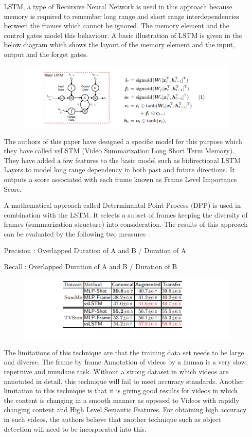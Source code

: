 \documentclass[twocolumn,showpacs,%
  nofootinbib,aps,superscriptaddress,%
  eqsecnum,prd,notitlepage,showkeys,10pt]{revtex4-1}
\begin{document}
LSTM, a type of Recursive Neural Network is used in this approach because memory is required to remember long range and short range interdependencies between the frames which cannot be ignored. The memory element and the control gates model this behaviour. A basic illustration of LSTM is given in the below diagram which shows the layout of the memory element and the input, output and the forget gates.
\begin{figure}[h]
\includegraphics[width=\linewidth]{img1.PNG}
\end{figure}

The authors of this paper have designed a specific model for this purpose which they have called vsLSTM (Video Summarization Long Short Term Memory). They have added a few features to the basic model such as bidirectional LSTM Layers to model long range dependency in both past and future directions. It outputs a score associated with each frame known as Frame Level Importance Score.

A mathematical approach called Determinantal Point Process (DPP) is used in combination with the LSTM. It selects a subset of frames keeping the diversity of frames (summarization structure) into consideration.
The results of this approach can be evaluated by the following two measures :

Precision :	Overlapped Duration of A and B / Duration of A

Recall :	Overlapped Duration of A and B / Duration of B

\begin{figure}[h]
\includegraphics[width=\linewidth]{img2.PNG}
\end{figure}

The limitations of this technique are that the training data set needs to be large and diverse. The frame by frame Annotation of videos by a human is a very slow, repetitive and mundane task. Without a strong dataset in which videos are annotated in detail, this technique will fail to meet accuracy standards. Another limitation to this technique is that it is giving good results for videos in which the content is changing in a smooth manner as opposed to Videos with rapidly changing content and High Level Semantic Features. For obtaining high accuracy in such videos, the authors believe that another technique such as object detection will need to be incorporated into this.
\end{document}

